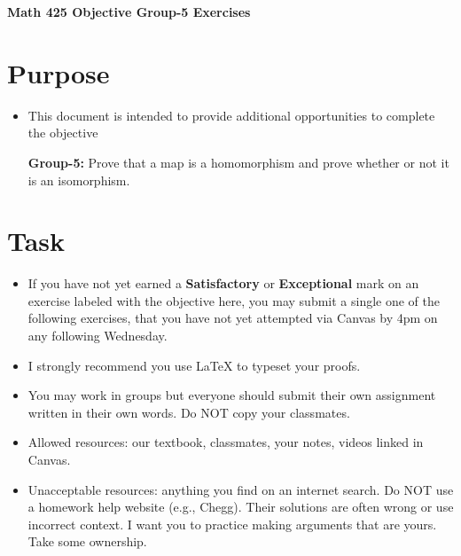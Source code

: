 \documentclass[12pt]{article}
\begin{document}
	\begin{center}
		{\Large \bf Math 425 Objective Group-5 Exercises}
	\end{center}
	\section*{Purpose}
	\begin{itemize}
		\item This document is intended to provide additional opportunities to complete the objective
		
		\textbf{Group-5:} Prove that a map is a homomorphism and prove whether or not it is an isomorphism.
	\end{itemize}
	\section*{Task}
	\begin{itemize}
		\item If you have not yet earned a \textbf{Satisfactory} or \textbf{Exceptional} mark on an exercise labeled with the objective here, you may submit a single one of the following exercises, that you have not yet attempted via Canvas by 4pm on any following Wednesday.
		\item I strongly recommend you use LaTeX to typeset your proofs.
		\item You may work in groups but everyone should submit their own assignment written in their own words.  Do NOT copy your classmates.
		\item Allowed resources: our textbook, classmates, your notes, videos linked in Canvas.
		\item Unacceptable resources: anything you find on an internet search. Do NOT use a homework help website (e.g., Chegg). Their solutions are often wrong or use incorrect context.  I want you to practice making arguments that are yours. Take some ownership.
	\end{itemize}
\end{document}
